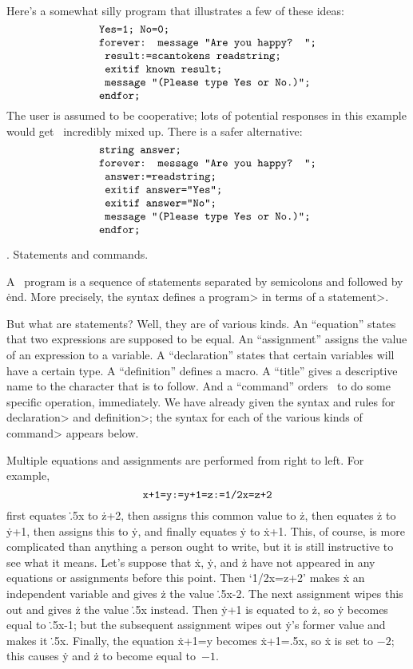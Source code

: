 Here's a somewhat silly program that illustrates a few of these ideas:
$$\vcenter{\halign{\tt#\hfil\cr
Yes=1; No=0;\cr
forever: message "Are you happy? ";\cr
\ result:=scantokens readstring;\cr
\ exitif known result;\cr
\ message "(Please type Yes or No.)";\cr
endfor;\cr}}$$
The user is assumed to be cooperative; lots of potential responses
in this example would get \MF\ incredibly mixed up. There is a
safer alternative:
$$\vcenter{\halign{\tt#\hfil\cr
string answer;\cr
forever: message "Are you happy? ";\cr
\ answer:=readstring;\cr
\ exitif answer="Yes";\cr
\ exitif answer="No";\cr
\ message "(Please type Yes or No.)";\cr
endfor;\cr}}$$

. Statements and commands.

A \MF\ program is a sequence of statements separated by semicolons and
followed by \.{end}. More precisely, the syntax
defines a \<program> in terms of a \<statement>.

But what are statements? Well, they are of various kinds. An ``equation''
states that two expressions are supposed to be equal. An ``assignment''
assigns the value of an expression to a variable. A ``declaration''
states that certain variables will have a certain type.
A ``definition'' defines a macro.  A ``title''
gives a descriptive name to the character that is to follow.
And a ``command'' orders \MF\ to do some specific operation, immediately.
We have already given the syntax and rules for \<declaration> and
\<definition>; the syntax for each of the various kinds of \<command>
appears below.

Multiple equations and assignments are performed from right to left.
For example,
$$\hbox{\tt x+1=y:=y+1=z:=1/2x=z+2}$$
first equates \.{.5x} to \.{z+2}, then assigns this common value to \.z,
then equates \.z to \.{y+1}, then assigns this to \.y, and finally
equates \.y to \.{x+1}. This, of course, is more complicated than anything
a person ought to write, but it is still instructive to see what it means.
Let's suppose that \.x, \.y, and \.z have not appeared in any equations
or assignments before this point. Then `\.{1/2x=z+2}' makes \.x an
independent variable and gives \.z the value \.{.5x-2}. The next
assignment wipes this out and gives \.z the value \.{.5x} instead.
Then \.{y+1} is equated to \.z, so \.y becomes equal to \.{.5x-1};
but the subsequent assignment wipes out \.y's former value and
makes it \.{.5x}. Finally, the equation \.{x+1=y} becomes \.{x+1=.5x},
so \.x is set to $-2$; this causes \.y and \.z to become equal to~$-1$.

